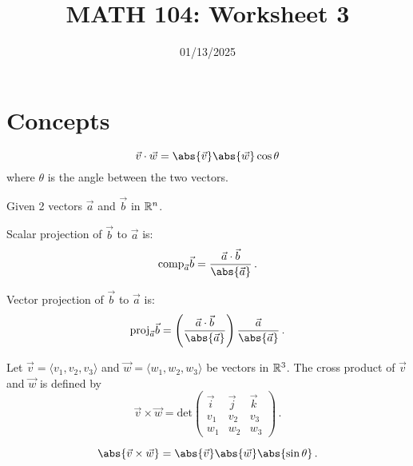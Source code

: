 \documentclass[12pt]{amsart}
\title{ MATH 104: Worksheet 3}
\author{}
\date{01/13/2025}
\begin{document}
\maketitle

\section{Concepts}


\begin{theorem}
	\begin{equation*}
		\vec{v} \cdot \vec{w} = \abs{\vec{v}} \abs{ \vec{w}} \cos\theta
	\end{equation*}
	where $\theta$ is the angle between the two vectors.
\end{theorem}

\begin{definition}[Projections]
	Given 2 vectors $\vec{a}$ and $\vec{b}$ in $\mathbb{R}^n$.

	Scalar projection of $\vec{b}$ to $\vec{a}$ is:
	\begin{equation*}
		\mathrm{comp}_{\vec{a}} \vec{b} = \frac{ \vec{a} \cdot \vec{b}}{\abs{\vec{a}}} \,.
	\end{equation*}

	Vector projection of $\vec{b}$ to $\vec{a}$ is:
	\begin{equation*}
		\mathrm{proj}_{\vec{a}} \vec{b} = \left(\frac{ \vec{a} \cdot \vec{b}}{\abs{\vec{a}}}\right) \frac{\vec{a}}{\abs{\vec{a}}} \,.
	\end{equation*}
\end{definition}

\begin{definition}
	Let $\vec{v} = \langle v_1, v_2, v_3 \rangle$ and $\vec{w} = \langle w_1, w_2, w_3 \rangle$ be vectors in $\mathbb{R}^3$.
	The cross product of $\vec{v}$ and $\vec{w}$ is defined by
	\begin{equation*}
		\vec{v} \times \vec{w} =
		\mathrm{det} \begin{pmatrix}
			\vec{i} & \vec{j} & \vec{k} \\
			v_1     & v_2     & v_3     \\
			w_1     & w_2     & w_3
		\end{pmatrix} \,.
	\end{equation*}
\end{definition}

\begin{theorem}
	\begin{equation*}
		\abs{ \vec{v} \times \vec{w}} = \abs{\vec{v}} \abs{\vec{w}} \abs{\sin \theta}  \,.
	\end{equation*}
\end{theorem}
\end{document}
